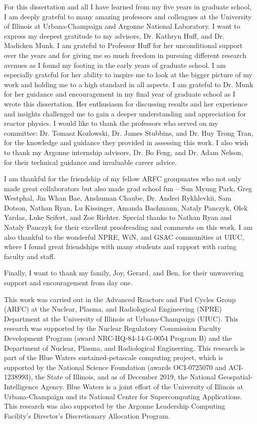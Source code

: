 For this dissertation and all I have learned from my five years in graduate school, 
I am deeply grateful to many amazing professors and colleagues at the University of 
Illinois at Urbana-Champaign and Argonne National Laboratory. 
I want to express my deepest gratitude to my advisors, Dr. Kathryn Huff, and Dr. 
Madicken Munk. 
I am grateful to Professor Huff for her unconditional support over the years and for 
giving me so much freedom in pursuing different research avenues as I found my footing 
in the early years of graduate school. 
I am especially grateful for her ability to inspire me to look at the bigger picture of 
my work and holding me to a high standard in all aspects.
I am grateful to Dr. Munk for her guidance and encouragement in my final year 
of graduate school as I wrote this dissertation. 
Her enthusiasm for discussing results and her experience and insights challenged me to 
gain a deeper understanding and appreciation for reactor physics.  
I would like to thank the professors who served on my committee: Dr. Tomasz 
Kozlowski, Dr. James Stubbins, and Dr. Huy Trong Tran, for the knowledge and guidance 
they provided in assessing this work. 
I also wish to thank my Argonne internship advisors, Dr. Bo Feng, and Dr. Adam Nelson, 
for their technical guidance and invaluable career advice. 

I am thankful for the friendship of my fellow ARFC groupmates who not only made great 
collaborators but also made grad school fun -- Sun Myung Park, Greg Westphal, 
Jin Whan Bae, Anshuman Chaube, Dr. Andrei Rykhlevkii, Sam Dotson, Nathan Ryan, 
Lu Kissinger, Amanda Bachmann, Nataly Panczyk, Olek Yardas, Luke Seifert, and Zoe Richter. 
Special thanks to Nathan Ryan and Nataly Panczyk for their excellent proofreading 
and comments on this work. 
I am also thankful to the wonderful NPRE, WiN, and GSAC communities at UIUC, where 
I found great friendships with many students and rapport with caring faculty and staff. 

Finally, I want to thank my family, Joy, Gerard, and Ben, for their unwavering support 
and encouragement from day one. 

This work was carried out in the Advanced Reactors and Fuel Cycles Group (ARFC) at the 
Nuclear, Plasma, and Radiological Engineering (NPRE) Department at the University of 
Illinois at Urbana-Champaign (UIUC). 
This research was supported by the Nuclear Regulatory Commission Faculty Development 
Program (award NRC-HQ-84-14-G-0054 Program B) and the Department of Nuclear, Plasma, 
and Radiological Engineering.
This research is part of the Blue Waters sustained-petascale computing project, 
which is supported by the National Science Foundation (awards OCI-0725070 and 
ACI-1238993), the State of Illinois, and as of December 2019, the National 
Geospatial-Intelligence Agency. 
Blue Waters is a joint effort of the University of Illinois at Urbana-Champaign and 
its National Center for Supercomputing Applications.
This research was also supported by the Argonne Leadership Computing Facility's 
Director's Discretionary Allocation Program. 